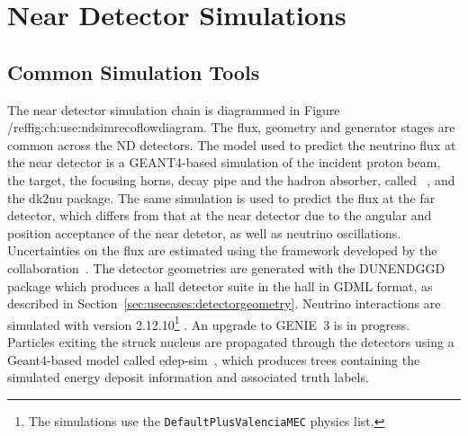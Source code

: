\documentclass[../main-v1.tex]{subfiles}
\begin{document}
\section{Near Detector Simulations}\label{ch:use:nd}


\subsection{Common Simulation Tools}

The near detector simulation chain is diagrammed in Figure /ref{fig:ch:use:ndsimrecoflowdiagram}. The flux, geometry and generator stages are common across the ND detectors. 
The model used to predict the neutrino flux at the near detector is a GEANT4-based simulation of the incident proton beam, the target, the focusing horns, decay pipe and the hadron absorber, called ~\cite{DUNE:2020ypp}, and the dk2nu package.  The same simulation is used to predict the flux at the far detector, which differs from that at the near detector due to the angular and position acceptance of the near detetor, as well as neutrino oscillations.  Uncertainties on the flux are estimated using the  framework developed by the  collaboration~\cite{Aliaga:2016oaz,AliagaSoplin:2016shs}.
The detector geometries are generated with the DUNENDGGD package which produces a hall detector suite in the hall in GDML format, as described in Section~\ref{sec:usecases:detectorgeometry}. Neutrino interactions are simulated with  version 2.12.10\footnote{The simulations use the \texttt{DefaultPlusValenciaMEC} physics list.} \cite{Andreopoulos:2009rq}. An upgrade to GENIE~3 is in progress. Particles exiting the struck nucleus are propagated through the detectors using a Geant4-based model called edep-sim~\cite{ref:edep-sim}, which produces  trees containing the simulated energy deposit information and associated truth labels.
\end{document}
